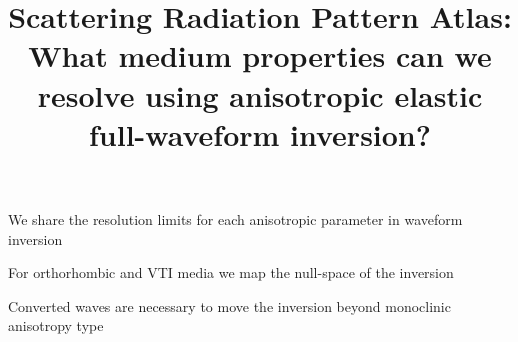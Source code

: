 \documentclass[draft]{agujournal2018}
\begin{document}
\title{Scattering Radiation Pattern Atlas: What medium properties can we resolve using anisotropic elastic full-waveform inversion?}








\begin{keypoints}
	\item We share the resolution limits for each anisotropic parameter in waveform inversion
	\item For orthorhombic and VTI media we map the null-space of the inversion
	\item Converted waves are necessary to move the inversion beyond monoclinic anisotropy type
\end{keypoints}





	



	













\end{document}

